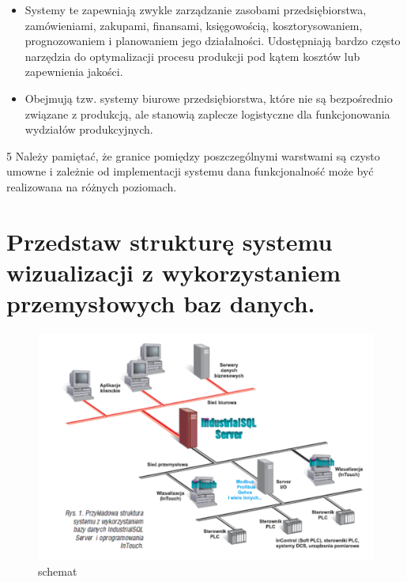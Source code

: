 \documentclass{article}
\begin{document}
       	\begin{itemize}
       	\item Systemy te zapewniają zwykle zarządzanie zasobami przedsiębiorstwa,
       	zamówieniami, zakupami, finansami, księgowością, kosztorysowaniem,
       	prognozowaniem i planowaniem jego działalności. Udostępniają bardzo często
       	narzędzia do optymalizacji procesu produkcji pod kątem kosztów lub
       	zapewnienia jakości.
       	\item Obejmują tzw. systemy biurowe przedsiębiorstwa, które nie są bezpośrednio
       	związane z produkcją, ale stanowią zaplecze logistyczne dla funkcjonowania
       	wydziałów produkcyjnych.
       	       	\end{itemize}5
       	Należy pamiętać, że granice pomiędzy poszczególnymi warstwami są czysto
       	umowne i zależnie od implementacji systemu dana funkcjonalność może być
       	realizowana na różnych poziomach.
       	
	\section{Przedstaw strukturę systemu wizualizacji z wykorzystaniem przemysłowych baz	danych.}
	\begin{figure}[!htb]
		\centering
		\includegraphics[width=0.7\linewidth]{industrialSQL}
		\caption{schemat}
		\label{fig:industrialsql}
	\end{figure}
	
\end{document}
